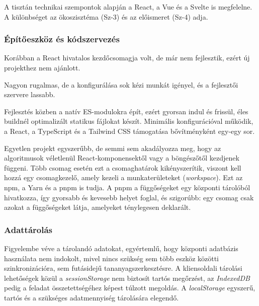 A tisztán technikai szempontok alapján a React, a Vue és a Svelte is
megfelelne. A különbséget az ökoszisztéma (Sz-3) és az előismeret
(Sz-4) adja.

\subsubsection{Építőeszköz és kódszervezés}
\label{sec:tech-build}

\begin{compactdesc}
    \item[Create React App] Korábban a React hivatalos kezdőcsomagja
          volt, de már nem fejlesztik, ezért új projekthez nem ajánlott.
    \item[webpack] Nagyon rugalmas, de a konfigurálása sok kézi munkát
          igényel, és a fejlesztői szervere lassabb.
    \item[Vite] Fejlesztés közben a natív ES-modulokra épít, ezért
          gyorsan indul és frissül, éles buildnél optimalizált statikus
          fájlokat készít. Minimális konfigurációval működik, a React,
          a TypeScript és a Tailwind CSS támogatása bővítményként
          egy-egy sor.
\end{compactdesc}

 Egyetlen projekt
egyszerűbb, de semmi sem akadályozza meg, hogy az algoritmusok
véletlenül React-komponensektől vagy a böngészőtől kezdjenek függeni.
Több csomag esetén ezt a csomaghatárok kikényszerítik, viszont kell
hozzá egy csomagkezelő, amely kezeli a munkaterületeket
(\emph{workspace}). Ezt az npm, a Yarn és a pnpm is tudja. A pnpm a
függőségeket egy központi tárolóból hivatkozza, így gyorsabb és
kevesebb helyet foglal, és szigorúbb: egy csomag csak azokat a
függőségeket látja, amelyeket ténylegesen deklarált.

\subsubsection{Adattárolás}
Figyelembe véve a tárolandó adatokat, egyértemlű, hogy központi adatbázis használata nem indokolt, mivel nincs szükség sem több
 eszköz közötti szinkronizációra, sem futásidejű tananyagszerkesztésre.
 A kliensoldali tárolási lehetőségek közül a \emph{sessionStorage} nem biztosít tartós megőrzést, az \emph{IndexedDB} pedig a feladat összetettségéhez képest túlzott megoldás. A \emph{localStorage} egyszerű, tartós és a szükséges adatmennyiség tárolására elegendő.


